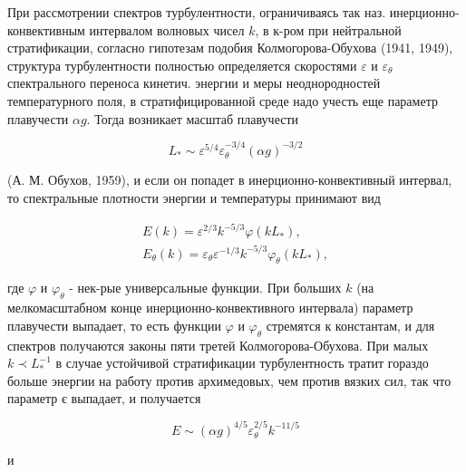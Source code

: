 \documentclass[10pt]{article}
\begin{document}
При рассмотрении спектров турбулентности, ограничиваясь так наз. инерционно-конвективным интервалом волновых чисел $k$, в к-ром при нейтральной стратификации, согласно гипотезам подобия Колмогорова-Обухова (1941, 1949), структура турбулентности полностью определяется скоростями $\varepsilon$ и $\varepsilon_{\theta}$ спектрального переноса кинетич. энергии и меры неоднородностей температурного поля, в стратифицированной среде надо учесть еще параметр плавучести $\alpha g$. Тогда возникает масштаб плавучести



\[

L_{*} \sim \varepsilon^{5 / 4} \varepsilon_{\theta}^{-3 / 4}(\alpha g)^{-3 / 2}

\]



(А. М. Обухов, 1959), и если он попадет в инерционно-конвективный интервал, то спектральные плотности энергии и температуры принимают вид



\[

\begin{gathered}

E(k)=\varepsilon^{2 / 3} k^{-5 / 3} \varphi\left(k L_{*}\right), \\

E_{\theta}(k)=\varepsilon_{\theta} \varepsilon^{-1 / 3} k^{-5 / 3} \varphi_{\theta}\left(k L_{*}\right),

\end{gathered}

\]



где $\varphi$ и $\varphi_{\theta}$ - нек-рые универсальные функции. При больших $k$ (на мелкомасштабном конце инерционно-конвективного интервала) параметр плавучести выпадает, то есть функции $\varphi$ и $\varphi_{\theta}$ стремятся к константам, и для спектров получаются законы пяти третей Колмогорова-Обухова. При малых $k \prec L_{*}^{-1}$ в случае устойчивой стратификации турбулентность тратит гораздо больше энергии на работу против архимедовых, чем против вязких сил, так что параметр є выпадает, и получается



\[

E \sim(\alpha g)^{4 / 5} \varepsilon_{\theta}^{2 / 5} k^{-11 / 5}

\]



и
\end{document}
